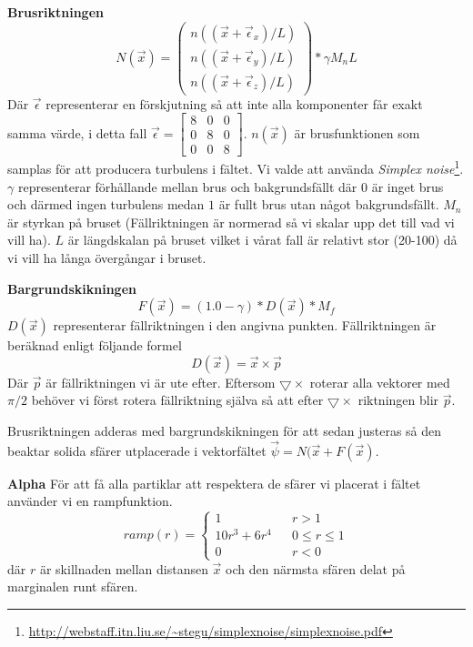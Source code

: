 \documentclass[a4paper]{article}
\begin{document}
    \textbf{Brusriktningen}
    \begin{equation}
   N(\vec{x}) =  
        \begin{pmatrix}
        n((\vec{x} + \vec{\epsilon}_x)/L)
        \\
        n((\vec{x} + \vec{\epsilon}_y)/L)
        \\ 
        n((\vec{x} + \vec{\epsilon}_z)/L)
        \end{pmatrix} * \gamma M_nL
    \end{equation}
    Där $\vec{\epsilon}$ representerar en förskjutning så att inte alla komponenter får exakt samma värde, i detta fall $\vec{\epsilon} = \begin{bmatrix}
8 & 0 & 0\\ 
0 & 8 & 0\\ 
0 & 0 & 8
\end{bmatrix}$. $n(\vec{x})$ är brusfunktionen som samplas för att producera turbulens i fältet. Vi valde att använda \textit{Simplex noise}\footnote{\url{http://webstaff.itn.liu.se/~stegu/simplexnoise/simplexnoise.pdf}}. $\gamma$ representerar förhållande mellan brus och bakgrundsfällt där $0$ är inget brus och därmed ingen turbulens medan $1$ är fullt brus utan något bakgrundsfällt. $M_n$ är styrkan på bruset (Fällriktningen är normerad så vi skalar upp det till vad vi vill ha). $L$ är längdskalan på bruset vilket i vårat fall är relativt stor (20-100) då vi vill ha långa övergångar i bruset.

\textbf{Bargrundskikningen}
\begin{equation}
    F(\vec{x}) = (1.0-\gamma) * D(\vec{x}) * M_f
\end{equation}
$D(\vec{x})$ representerar fällriktningen i den angivna punkten. Fällriktningen är beräknad enligt följande formel
\begin{equation}
   D(\vec{x}) = \vec{x} \times \vec{p}
\end{equation}
Där $\vec{p}$ är fällriktningen vi är ute efter. Eftersom $\bigtriangledown \times$ roterar alla vektorer med $\pi/2$ behöver vi först rotera fällriktning själva så att efter $\bigtriangledown \times$ riktningen blir $\vec{p}$.

Brusriktningen adderas med bargrundskikningen för att sedan justeras så den beaktar solida sfärer utplacerade i vektorfältet $\vec{\psi} = N(\vec{x} + F(\vec{x})$.

\textbf{Alpha}
För att få alla partiklar att respektera de sfärer vi placerat i fältet använder vi en rampfunktion.
\begin{equation}
ramp(r) = \left\{\begin{matrix}
1  && r > 1
\\
10r^3 + 6r^4 && 0 \le r \le 1
\\ 
0  && r < 0
\end{matrix}\right.
\end{equation}
där $r$ är skillnaden mellan distansen $\vec{x}$ och den närmsta sfären delat på marginalen runt sfären. 
\end{document}
